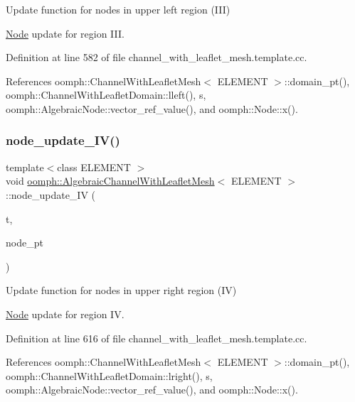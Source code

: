 Update function for nodes in upper left region (I\+II) 

\hyperlink{classoomph_1_1Node}{Node} update for region I\+II. 

Definition at line 582 of file channel\+\_\+with\+\_\+leaflet\+\_\+mesh.\+template.\+cc.



References oomph\+::\+Channel\+With\+Leaflet\+Mesh$<$ E\+L\+E\+M\+E\+N\+T $>$\+::domain\+\_\+pt(), oomph\+::\+Channel\+With\+Leaflet\+Domain\+::lleft(), s, oomph\+::\+Algebraic\+Node\+::vector\+\_\+ref\+\_\+value(), and oomph\+::\+Node\+::x().

\mbox{\label{classoomph_1_1AlgebraicChannelWithLeafletMesh_ac960faed226fa81f52ca605cffe3d1af}} 
\subsubsection{\texorpdfstring{node\+\_\+update\+\_\+\+I\+V()}{node\_update\_IV()}}
{\footnotesize\ttfamily template$<$class E\+L\+E\+M\+E\+NT $>$ \\
void \hyperlink{classoomph_1_1AlgebraicChannelWithLeafletMesh}{oomph\+::\+Algebraic\+Channel\+With\+Leaflet\+Mesh}$<$ E\+L\+E\+M\+E\+NT $>$\+::node\+\_\+update\+\_\+\+IV (\begin{DoxyParamCaption}\item[{const unsigned \&}]{t,  }\item[{\hyperlink{classoomph_1_1AlgebraicNode}{Algebraic\+Node} $\ast$\&}]{node\+\_\+pt }\end{DoxyParamCaption})\hspace{0.3cm}{\ttfamily [protected]}}



Update function for nodes in upper right region (IV) 

\hyperlink{classoomph_1_1Node}{Node} update for region IV. 

Definition at line 616 of file channel\+\_\+with\+\_\+leaflet\+\_\+mesh.\+template.\+cc.



References oomph\+::\+Channel\+With\+Leaflet\+Mesh$<$ E\+L\+E\+M\+E\+N\+T $>$\+::domain\+\_\+pt(), oomph\+::\+Channel\+With\+Leaflet\+Domain\+::lright(), s, oomph\+::\+Algebraic\+Node\+::vector\+\_\+ref\+\_\+value(), and oomph\+::\+Node\+::x().

